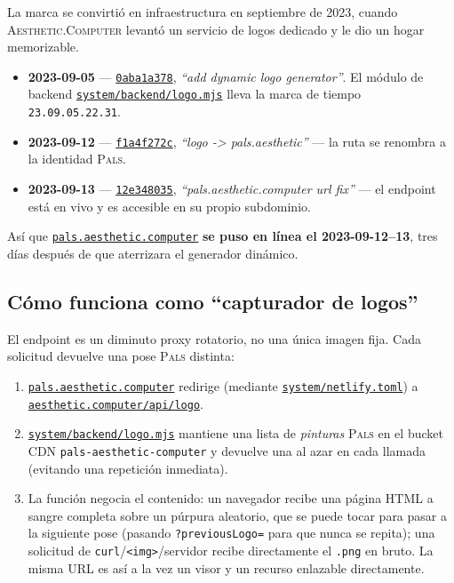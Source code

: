 \documentclass[10pt,letterpaper,twocolumn]{article}
\newcommand{\ac}{\textsc{Aesthetic}{\color{acpink}.}\textsc{Computer}}
\newcommand{\pals}{\textsc{Pals}}
\newcommand{\commit}[2]{\href{https://github.com/whistlegraph/aesthetic-computer/commit/#1}{\texttt{#1}}, \emph{``#2''}}
\newcommand{\repofile}[1]{\href{https://github.com/whistlegraph/aesthetic-computer/blob/main/#1}{\texttt{#1}}}
\begin{document}
La marca se convirtió en infraestructura en septiembre de 2023, cuando \ac{}
levantó un servicio de logos dedicado y le dio un hogar memorizable.

\begin{itemize}
  \item \textbf{2023-09-05} --- \commit{0aba1a378}{add dynamic logo
        generator}. El módulo de backend \repofile{system/backend/logo.mjs}
        lleva la marca de tiempo \texttt{23.09.05.22.31}.
  \item \textbf{2023-09-12} --- \commit{f1a4f272c}{logo -> pals.aesthetic}
        --- la ruta se renombra a la identidad \pals{}.
  \item \textbf{2023-09-13} --- \commit{12e348035}{pals.aesthetic.computer
        url fix} --- el endpoint está en vivo y es accesible en su propio
        subdominio.
\end{itemize}

\noindent Así que \href{https://pals.aesthetic.computer}{\texttt{pals.aesthetic.computer}}
\textbf{se puso en línea el 2023-09-12--13}, tres días después de que
aterrizara el generador dinámico.

\subsection{Cómo funciona como ``capturador de logos''}

El endpoint es un diminuto proxy rotatorio, no una única imagen fija. Cada
solicitud devuelve una pose \pals{} distinta:

\begin{enumerate}
  \item \href{https://pals.aesthetic.computer}{\texttt{pals.aesthetic.computer}}
        redirige (mediante \repofile{system/netlify.toml}) a
        \href{https://aesthetic.computer/api/logo}{\texttt{aesthetic.computer/api/logo}}.
  \item \repofile{system/backend/logo.mjs} mantiene una lista de
        \emph{pinturas} \pals{} en el bucket CDN
        \texttt{pals-aesthetic-computer} y devuelve una al azar en cada
        llamada (evitando una repetición inmediata).
  \item La función negocia el contenido: un navegador recibe una página HTML
        a sangre completa sobre un púrpura aleatorio, que se puede tocar para
        pasar a la siguiente pose (pasando \texttt{?previousLogo=} para que
        nunca se repita); una solicitud de
        \texttt{curl}/\texttt{<img>}/servidor recibe directamente el
        \texttt{.png} en bruto. La misma URL es así a la vez un visor y un
        recurso enlazable directamente.
\end{enumerate}
\end{document}
